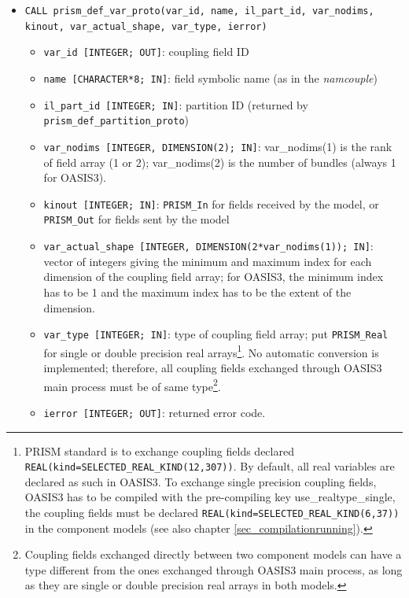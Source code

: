 \begin{itemize}

\item {\tt CALL prism\_def\_var\_proto(var\_id, name, il\_part\_id,
  var\_nodims, kinout, var\_actual\_shape, var\_type, ierror)}

\begin{itemize}
 \item {\tt var\_id [INTEGER; OUT]}: coupling field ID
 \item {\tt name [CHARACTER*8; IN]}: field symbolic name (as in the
   {\it namcouple})
 \item {\tt il\_part\_id [INTEGER; IN]}: partition ID (returned by
   {\tt prism\_def\_partition\-\_proto})
 \item {\tt var\_nodims [INTEGER, DIMENSION(2); IN]}: var\_nodims(1) is
   the rank of field array (1 or 2); var\_nodims(2) is the number of
   bundles (always 1 for OASIS3). 
 \item {\tt kinout [INTEGER; IN]}: {\tt PRISM\_In} for fields received by
   the model, or {\tt PRISM\_Out} for fields sent by the model 
 \item {\tt var\_actual\_shape [INTEGER, DIMENSION(2*var\_nodims(1)); IN]}: 
   vector of integers giving the minimum and maximum index for each
   dimension of the coupling field array; for OASIS3, the minimum
   index has to be 1 and the maximum index has to be the extent of the
   dimension.
 \item {\tt var\_type [INTEGER; IN]}: type of coupling field array;
   put {\tt PRISM\_Real} for single or double precision real
   arrays\footnote{PRISM standard is to exchange coupling fields
   declared {\tt REAL(kind=SELECTED\_REAL\_KIND(12,307))}. By default,
   all real variables are declared as such in OASIS3. To exchange
   single precision coupling fields, OASIS3 has to be compiled with
   the pre-compiling key use\_realtype\_single, the coupling fields
   must be declared {\tt REAL(kind=SELECTED\_REAL\_KIND(6,37))} in the
   component models (see also chapter \ref{sec_compilationrunning}).}. No automatic conversion is implemented;
   therefore, all coupling fields exchanged through OASIS3 main
   process must be of same type\footnote{Coupling fields exchanged
   directly between two component models can have a type different
   from the ones exchanged through OASIS3 main process, as long as
   they are single or double precision real arrays in both models.}.
 \item {\tt ierror [INTEGER; OUT]}: returned error code. 
\end{itemize}
\end{itemize}


